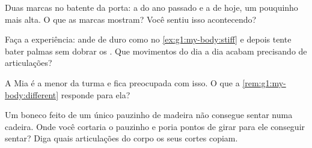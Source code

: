 \begin{exercise}[$\star$]\label{exo:g1:my-body:7}
Duas marcas no batente da porta: a do ano passado e a de hoje, um
pouquinho mais alta. O que as marcas mostram? Você sentiu isso
acontecendo?
\end{exercise}

\begin{exercise}[$\star$]\label{exo:g1:my-body:8}
Faça a experiência: ande de  duro como no
\cref{ex:g1:my-body:stiff} e depois tente bater palmas sem dobrar os
. Que movimentos do dia a dia acabam precisando de
articulações?
\end{exercise}

\begin{exercise}[$\star\star$]\label{exo:g1:my-body:9}
A Mia é a menor da turma e fica preocupada com isso. O que a
\cref{rem:g1:my-body:different} responde para ela?
\end{exercise}

\begin{exercise}[$\star\star$]\label{exo:g1:my-body:10}
Um boneco feito de um único pauzinho de madeira não consegue sentar
numa cadeira. Onde você cortaria o pauzinho e poria pontos de girar
para ele conseguir sentar? Diga quais articulações do corpo os seus
cortes copiam.
\end{exercise}
